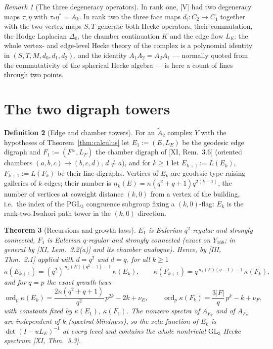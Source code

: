 \documentclass[11pt]{amsart}
\numberwithin{equation}{section}
\newtheorem{theorem}{Theorem}[section]
\theoremstyle{definition}
\newtheorem{definition}[theorem]{Definition}
\theoremstyle{remark}
\newtheorem{remark}[theorem]{Remark}
\newcommand{\ord}{\operatorname{ord}}
\newcommand{\PGL}{\mathrm{PGL}}
\newcommand{\Atwo}{\widetilde A_2}
\newcommand{\LE}{L_{E}}
\newcommand{\LF}{L_{F}}
\newcommand{\ta}{\tau_*}
\newcommand{\etp}{\eta^*}
\begin{document}
\begin{remark}[The three degeneracy operators]\label{rem:degeneracy}
In rank one, [V] had two degeneracy maps $\tau,\eta$ with $\ta\etp=A_k$. In rank two the
three face maps $d_i\colon C_2\to C_1$ together with the two vertex maps $S,T$ generate
both Hecke operators, their commutation, the Hodge Laplacian $\Delta_0$, the chamber
continuation $K$ and the edge flow $\LE$: the whole vertex- and edge-level Hecke theory of
the complex is a polynomial identity in $(S,T,M,d_0,d_1,d_2)$, and the identity
$A_1A_2=A_2A_1$ --- normally quoted from the commutativity of the spherical Hecke algebra
--- is here a count of lines through two points.
\end{remark}

\section{The two digraph towers}\label{sec:towers}

\begin{definition}[Edge and chamber towers]\label{def:towers}
For an $\Atwo$ complex $Y$ with the hypotheses of Theorem~\ref{thm:calculus} let
$E_1:=(E,\LE)$ be the geodesic edge digraph and $F_1:=(F^{\pm},\LF)$ the chamber digraph of
[XI, Rem.~3.6] (oriented chambers $(a,b,c)\to(b,c,d)$, $d\ne a$), and for $k\ge1$ let
$E_{k+1}:=L(E_k)$, $F_{k+1}:=L(F_k)$ be their line digraphs. Vertices of $E_k$ are geodesic
type-raising galleries of $k$ edges; their number is
$n_k(E)=n(q^{2}+q+1)q^{2(k-1)}$, the number of vertices at coweight distance $(k,0)$ from a
vertex of the building, i.e.\ the index of the $\PGL_3$ congruence subgroup fixing a
$(k,0)$-flag: $E_k$ is the rank-two Iwahori path tower in the $(k,0)$ direction.
\end{definition}

\begin{theorem}[Recursions and growth laws]\label{thm:towers}
$E_1$ is Eulerian $q^{2}$-regular and strongly connected, $F_1$ is Eulerian $q$-regular and
strongly connected (exact on $Y_{168}$; in general by {\rm[XI, Lem.~3.2(a)]} and its chamber
analogue). Hence, by {\rm[III, Thm.~2.1]} applied with $d=q^{2}$ and $d=q$, for all $k\ge1$
\[
\kappa(E_{k+1})=(q^{2})^{\,n_k(E)(q^{2}-1)-1}\,\kappa(E_k),\qquad
\kappa(F_{k+1})=q^{\,n_k(F)(q-1)-1}\,\kappa(F_k),
\]
and for $q=p$ the exact growth laws
\[
\ord_p\kappa(E_k)=\frac{2n(q^{2}+q+1)}{q^{2}}\,p^{2k}-2k+\nu_E,\qquad
\ord_p\kappa(F_k)=\frac{3|F|}{q}\,p^{k}-k+\nu_F ,
\]
with constants fixed by $\kappa(E_1)$, $\kappa(F_1)$. The nonzero spectra of $A_{E_k}$ and of
$A_{F_k}$ are independent of $k$ (spectral blindness), so the zeta function of $E_k$ is
$\det(I-u\LE)^{-1}$ at every level and contains the whole nontrivial $\mathrm{GL}_3$ Hecke
spectrum {\rm[XI, Thm.~3.3]}.
\end{theorem}
\end{document}
